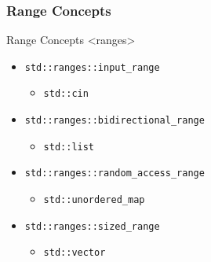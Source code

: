 \subsubsection{Range Concepts}

\begin{frame}[fragile]{Range Concepts <ranges>}
    \begin{itemize}
        \item<1-> \texttt{std::ranges::input_range}
            \begin{itemize} \item \texttt{std::cin} \end{itemize}
        \item<2-> \texttt{std::ranges::bidirectional_range}
            \begin{itemize} \item \texttt{std::list} \end{itemize}
        \item<3-> \texttt{std::ranges::random_access_range}
            \begin{itemize} \item \texttt{std::unordered_map} \end{itemize}
        \item<4-> \texttt{std::ranges::sized_range}
            \begin{itemize} \item \texttt{std::vector} \end{itemize}
    \end{itemize}
\end{frame}



